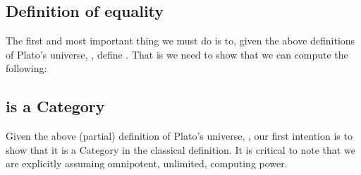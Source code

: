 \documentclass[a4paper,openany]{amsbook}
\begin{document}
\begin{prooftree}
\end{prooftree}

\begin{prooftree}
\end{prooftree}

\subsection{Definition of equality}

The first and most important thing we must do is to, given the above definitions of
Plato's universe, \Universe{}{}, define .  That is we need to show that
we can compute the following:

\begin{prooftree}
\end{prooftree}

\begin{prooftree}
\end{prooftree}

\subsection{\Universe{}{} is a Category}

Given the above (partial) definition of Plato's universe, \Universe{}{}, our first
intention is to show that it is a Category in the classical definition.  It is critical to
note that we are explicitly assuming omnipotent, unlimited, computing power.
\end{document}
